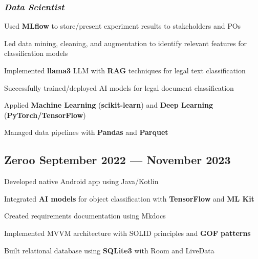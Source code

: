 \documentclass[a4paper,12pt]{article}
\begin{document}
\subsubsection*{\normalsize \textit{Data Scientist}}
\vspace{-1em}
\vspace{-0.5em}
\begin{zitemize}
    \item Used \textbf{MLflow} to store/present experiment results to stakeholders and POs
    \item Led data mining, cleaning, and augmentation to identify relevant features for classification models
    \item Implemented \textbf{llama3} LLM with \textbf{RAG} techniques for legal text classification
    \item Successfully trained/deployed AI models for legal document classification
    \item Applied \textbf{Machine Learning} (\textbf{scikit-learn}) and \textbf{Deep Learning} (\textbf{PyTorch/TensorFlow})
    \item Managed data pipelines with \textbf{Pandas} and \textbf{Parquet}
\end{zitemize}

\vspace{1.5em}
\vspace*{7pt}
\vspace{1.5em}

\subsection*{\large Zeroo \hfill September 2022 --- November 2023}

\vspace{-0.5em}
\begin{zitemize}
    \item Developed native Android app using Java/Kotlin
    \item Integrated \textbf{AI models} for object classification with \textbf{TensorFlow} and \textbf{ML Kit}
    \item Created requirements documentation using Mkdocs
    \item Implemented MVVM architecture with SOLID principles and \textbf{GOF patterns}
    \item Built relational database using \textbf{SQLite3} with Room and LiveData
\end{zitemize}
\end{document}
